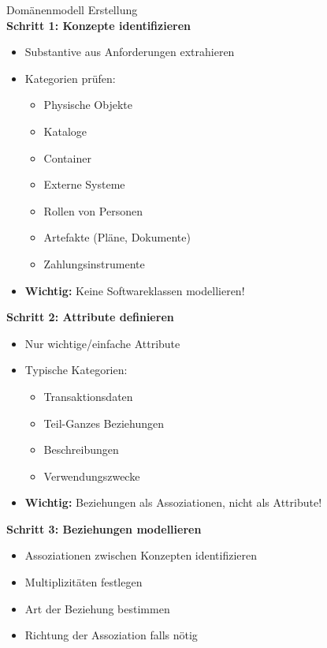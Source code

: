 \begin{KR}{Domänenmodell Erstellung}\\
\textbf{Schritt 1: Konzepte identifizieren}
\begin{itemize}
    \item Substantive aus Anforderungen extrahieren
    \item Kategorien prüfen:
    \begin{itemize}
        \item Physische Objekte
        \item Kataloge
        \item Container
        \item Externe Systeme
        \item Rollen von Personen
        \item Artefakte (Pläne, Dokumente)
        \item Zahlungsinstrumente
    \end{itemize}
    \item \textbf{Wichtig:} Keine Softwareklassen modellieren!
\end{itemize}

\textbf{Schritt 2: Attribute definieren}
\begin{itemize}
    \item Nur wichtige/einfache Attribute
    \item Typische Kategorien:
    \begin{itemize}
        \item Transaktionsdaten
        \item Teil-Ganzes Beziehungen
        \item Beschreibungen
        \item Verwendungszwecke
    \end{itemize}
    \item \textbf{Wichtig:} Beziehungen als Assoziationen, nicht als Attribute!
\end{itemize}

\textbf{Schritt 3: Beziehungen modellieren}
\begin{itemize}
    \item Assoziationen zwischen Konzepten identifizieren
    \item Multiplizitäten festlegen
    \item Art der Beziehung bestimmen
    \item Richtung der Assoziation falls nötig
\end{itemize}
\end{KR}

